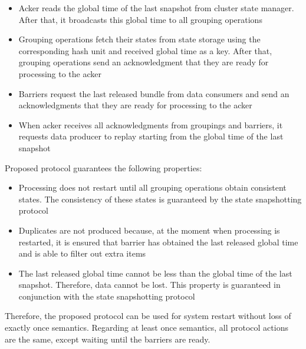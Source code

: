 \begin{itemize}
    \item Acker reads the global time of the last snapshot from cluster state manager. After that, it broadcasts this global time to all grouping operations
    \item Grouping operations fetch their states from state storage using the corresponding hash unit and received global time as a key. After that, grouping operations send an acknowledgment that they are ready for processing to the acker 
    \item Barriers request the last released bundle from data consumers and send an acknowledgments that they are ready for processing to the acker
    \item When acker receives all acknowledgments from groupings and barriers, it requests data producer to replay starting from the global time of the last snapshot  
\end{itemize}

Proposed protocol guarantees the following properties:

\begin{itemize}
    \item Processing does not restart until all grouping operations obtain consistent states. The consistency of these states is guaranteed by the state snapshotting protocol
    \item Duplicates are not produced because, at the moment when processing is restarted, it is ensured that barrier has obtained the last released global time and is able to filter out extra items
    \item The last released global time cannot be less than the global time of the last snapshot. Therefore, data cannot be lost. This property is guaranteed in conjunction with the state snapshotting protocol
\end{itemize}

Therefore, the proposed protocol can be used for system restart without loss of exactly once semantics. Regarding at least once semantics, all protocol actions are the same, except waiting until the barriers are ready.
